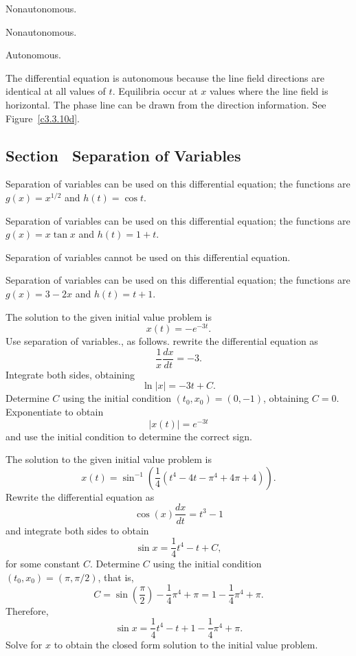 \documentclass{ximera}
\begin{document}
\begin{figure}[ht]
     \centerline{%
     }
\end{figure} 

 Nonautonomous.

 Nonautonomous.

 \ans Autonomous.

\soln  The differential equation is autonomous because the line field 
directions are identical at all values of $t$.  Equilibria occur at
$x$ values where the line field is horizontal.  The phase line can be
drawn from the direction information.  See Figure~\ref{c3.3.10d}.

\begin{figure}[ht]
     \centerline{%
     }
\end{figure}



\newpage
\subsection*{Section~\protect{\ref{sec:sov}} Separation of Variables}

 \ans Separation of variables can be used on this differential
equation; the functions are $g(x) = x^{1/2}$ and $h(t) = \cos t$.

 \ans Separation of variables can be used on this differential
equation; the functions are $g(x) = x\tan x$ and $h(t) = 1 + t$.

 \ans Separation of variables cannot be used on this
differential equation.

 \ans Separation of variables can be used on this differential
equation; the functions are $g(x) = 3 - 2x$ and $h(t) = t + 1$.

 \ans The solution to the given initial value problem is
\[
x(t) = -e^{-3t}.
\]
\soln Use separation of variables., as follows.  rewrite the differential 
equation as
\[
\frac{1}{x}\frac{dx}{dt} = -3.
\]
Integrate both sides, obtaining 
\[
\ln|x| = -3t + C.
\]
Determine $C$ using the initial condition $(t_0,x_0)=(0,-1)$, obtaining
$C=0$.  Exponentiate to obtain 
\[
|x(t)| = e^{-3t}
\]
and use the initial condition to determine the correct sign.

 \ans The solution to the given initial value problem is
\[
x(t) = \sin^{-1}\left(\frac{1}{4}(t^4 - 4t - \pi^4 + 4\pi + 4)\right).
\]
\soln Rewrite the differential equation as
\[
\cos(x) \frac{dx}{dt} = t^3 - 1
\]
and integrate both sides to obtain
\[
\sin x = \frac{1}{4}t^4 - t + C,
\]
for some constant $C$.  Determine $C$ using the initial condition 
$(t_0,x_0)=(\pi,\pi/2)$, that is,
\[
C = \sin\left(\frac{\pi}{2}\right) - \frac{1}{4}\pi^4 + \pi 
= 1 - \frac{1}{4}\pi^4 + \pi.
\]
Therefore,
\[
\sin x = \frac{1}{4}t^4 - t + 1 - \frac{1}{4}\pi^4 + \pi.
\]
Solve for $x$ to obtain the closed form solution to the initial value problem.
\end{document}
